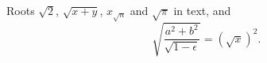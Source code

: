 \documentclass{article}
\begin{document}
Roots $\sqrt{2}$, $\sqrt {x+y}$, $x_{\sqrt{n}}$ and $\sqrt\pi$ in text, and
\[ \sqrt{\frac{a^2+b^2}{\sqrt{1-\epsilon}}} = \left( \sqrt{x} \right)^{2}. \]
\end{document}
